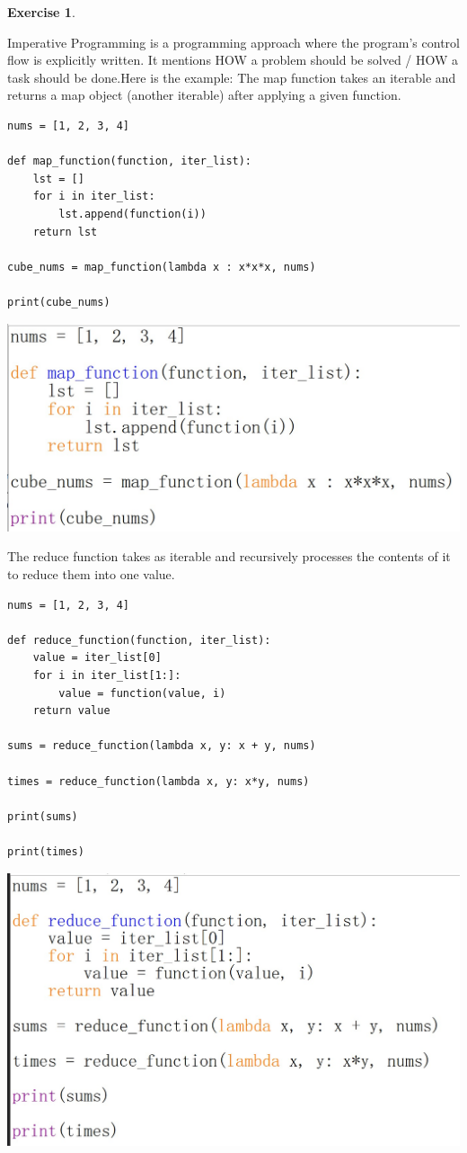 \documentclass[11pt,a4paper,leqno]{article}
\theoremstyle{definition}
\newtheorem{exercise}{Exercise}
\begin{document}
\begin{exercise}
\begin{enumerate}
Imperative Programming is a programming approach where the program's control flow is explicitly written.
It mentions HOW a problem should be solved / HOW a task should be done.Here is the example:
The map function takes an iterable and returns a map object (another iterable) after applying a given function.
\begin{center}
    \begin{verbatim}
nums = [1, 2, 3, 4]

def map_function(function, iter_list):
    lst = []
    for i in iter_list:
        lst.append(function(i))
    return lst

cube_nums = map_function(lambda x : x*x*x, nums)

print(cube_nums)

    \end{verbatim}
\includegraphics[scale=0.5]{map.jpg}
\end{center}
The reduce function takes as iterable and recursively processes the contents of it to reduce them into one value.
\begin{center}
    \begin{verbatim}
nums = [1, 2, 3, 4]

def reduce_function(function, iter_list):
    value = iter_list[0]
    for i in iter_list[1:]:
        value = function(value, i)
    return value

sums = reduce_function(lambda x, y: x + y, nums)

times = reduce_function(lambda x, y: x*y, nums)

print(sums)

print(times)
    \end{verbatim}
\includegraphics[scale=0.5]{reduce.jpg}
\end{center}


\end{enumerate}
\end{exercise}
\end{document}
